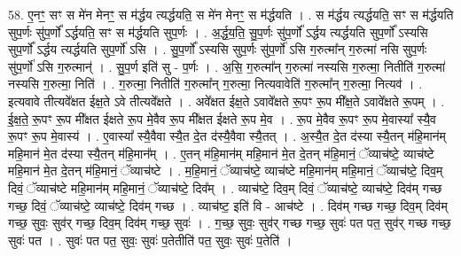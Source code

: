 \documentclass[17pt]{extarticle}
\begin{document}
58. ए॒नꣳ॒॒ सꣳ स मे॑न मेनꣳ॒॒ स म॑र्द्धय त्यर्द्धयति॒ स मे॑न मेनꣳ॒॒ स म॑र्द्धयति । . स म॑र्द्धय त्यर्द्धयति॒ सꣳ स म॑र्द्धयति सुप॒र्णः सु॑प॒र्णो᳚ ऽर्द्धयति॒ सꣳ स म॑र्द्धयति सुप॒र्णः । . अ॒र्द्ध॒य॒ति॒ सु॒प॒र्णः सु॑प॒र्णो᳚ ऽर्द्धय त्यर्द्धयति सुप॒र्णो᳚ ऽस्यसि सुप॒र्णो᳚ ऽर्द्धय त्यर्द्धयति सुप॒र्णो॑ ऽसि । . सु॒प॒र्णो᳚ ऽस्यसि सुप॒र्णः सु॑प॒र्णो॑ ऽसि ग॒रुत्मा᳚न् ग॒रुत्मा॑ नसि सुप॒र्णः सु॑प॒र्णो॑ ऽसि ग॒रुत्मान्॑ । . सु॒प॒र्ण इति॑ सु - प॒र्णः । . अ॒सि॒ ग॒रुत्मा᳚न् ग॒रुत्मा॑ नस्यसि ग॒रुत्मा॒ नितीति॑ ग॒रुत्मा॑ नस्यसि ग॒रुत्मा॒ निति॑ । . ग॒रुत्मा॒ नितीति॑ ग॒रुत्मा᳚न् ग॒रुत्मा॒ नित्यवावेति॑ ग॒रुत्मा᳚न् ग॒रुत्मा॒ नित्यव॑ । . इत्यवावे तीत्यवे᳚क्षत ईक्ष॒ते ऽवे तीत्यवे᳚क्षते । . अवे᳚क्षत ईक्ष॒ते ऽवावे᳚क्षते रू॒पꣳ रू॒प मी᳚क्ष॒ते ऽवावे᳚क्षते रू॒पम् । . ई॒क्ष॒ते॒ रू॒पꣳ रू॒प मी᳚क्षत ईक्षते रू॒प मे॒वैव रू॒प मी᳚क्षत ईक्षते रू॒प मे॒व । . रू॒प मे॒वैव रू॒पꣳ रू॒प मे॒वास्या᳚ स्यै॒व रू॒पꣳ रू॒प मे॒वास्य॑ । . ए॒वास्या᳚ स्यै॒वैवा स्यै॒त दे॒त द॑स्यै॒वैवा स्यै॒तत् । . अ॒स्यै॒त दे॒त द॑स्या स्यै॒तन् म॑हि॒मान॑म् महि॒मान॑ मे॒त द॑स्या स्यै॒तन् म॑हि॒मान᳚म् । . ए॒तन् म॑हि॒मान॑म् महि॒मान॑ मे॒त दे॒तन् म॑हि॒मानं॒ ॅव्याच॑ष्टे॒ व्याच॑ष्टे महि॒मान॑ मे॒त दे॒तन् म॑हि॒मानं॒ ॅव्याच॑ष्टे । . म॒हि॒मानं॒ ॅव्याच॑ष्टे॒ व्याच॑ष्टे महि॒मान॑म् महि॒मानं॒ ॅव्याच॑ष्टे॒ दिव॒म् दिवं॒ ॅव्याच॑ष्टे महि॒मान॑म् महि॒मानं॒ ॅव्याच॑ष्टे॒ दिव᳚म् । . व्याच॑ष्टे॒ दिव॒म् दिवं॒ ॅव्याच॑ष्टे॒ व्याच॑ष्टे॒ दिव॑म् गच्छ गच्छ॒ दिवं॒ ॅव्याच॑ष्टे॒ व्याच॑ष्टे॒ दिव॑म् गच्छ । . व्याच॑ष्ट॒ इति॑ वि - आच॑ष्टे । . दिव॑म् गच्छ गच्छ॒ दिव॒म् दिव॑म् गच्छ॒ सुवः॒ सुव॑र् गच्छ॒ दिव॒म् दिव॑म् गच्छ॒ सुवः॑ । . ग॒च्छ॒ सुवः॒ सुव॑र् गच्छ गच्छ॒ सुवः॑ पत पत॒ सुव॑र् गच्छ गच्छ॒ सुवः॑ पत । . सुवः॑ पत पत॒ सुवः॒ सुवः॑ प॒तेतीति॑ पत॒ सुवः॒ सुवः॑ प॒तेति॑ । \newline
\end{document}
